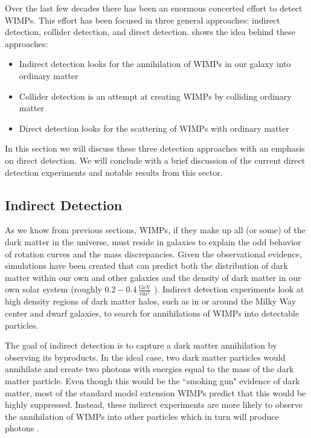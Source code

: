 Over the last few decades there has been an enormous concerted effort to detect WIMPs.  This effort has been focused in three general approaches: indirect detection, collider detection, and direct detection.   shows the idea behind these approaches:

\begin{itemize}
        \item Indirect detection looks for the annihilation of WIMPs in our galaxy into ordinary matter
        \item Collider detection is an attempt at creating WIMPs by colliding ordinary matter
        \item Direct detection looks for the scattering of WIMPs with ordinary matter
\end{itemize}

In this section we will discuss these three detection approaches with an emphasis on direct detection.  We will conclude with a brief discussion of the current direct detection experiments and notable results from this sector.

\subsection{Indirect Detection}
\label{sec:indirect_detection}

As we know from previous sections, WIMPs, if they make up all (or some) of the dark matter in the universe, must reside in galaxies to explain the odd behavior of rotation curves and the mass discrepancies.  Given the observational evidence, simulations have been created that can predict both the distribution of dark matter within our own and other galaxies \cite{stadel2009quantifying, maccio2007concentration} and the density of dark matter in our own solar system (roughly $0.2 - 0.4 \, \frac{\textrm{GeV}}{\textrm{cm}^3}$ \cite{read2014local}).  Indirect detection experiments look at high density regions of dark matter halos, such as in or around the Milky Way center and dwarf galaxies, to search for annihilations of WIMPs into detectable particles.

The goal of indirect detection is to capture a dark matter annihilation by observing its byproducts.  In the ideal case, two dark matter particles would annihilate and create two photons with energies equal to the mass of the dark matter particle.  Even though this would be the ``smoking gun" evidence of dark matter, most of the standard model extension WIMPs predict that this would be highly suppressed.  Instead, these indirect experiments are more likely to observe the annihilation of WIMPs into other particles which in turn will produce photons \cite{bi2013status}.  

